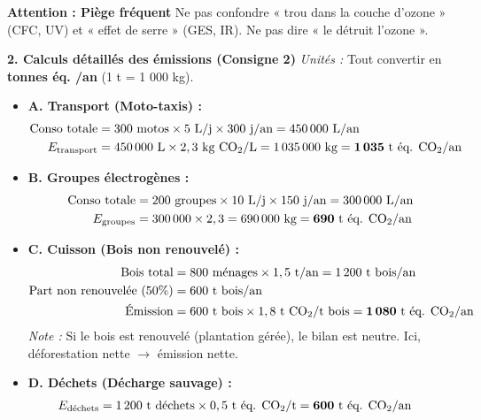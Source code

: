 \documentclass[11pt]{article}
\begin{document}
\begin{exoresolu}
\textbf{Attention : Piège fréquent}
Ne pas confondre « trou dans la couche d'ozone » (CFC, UV) et « effet de serre » (GES, IR). Ne pas dire « le  détruit l'ozone ».

\textbf{2. Calculs détaillés des émissions (Consigne 2)}
\emph{Unités :} Tout convertir en \textbf{tonnes éq. /an} (1 t = 1 000 kg).

\begin{itemize}
    \item \textbf{A. Transport (Moto-taxis) :}
    \begin{align*}
    \text{Conso totale} &= 300 \text{ motos} \times 5 \text{ L/j} \times 300 \text{ j/an} = 450\,000 \text{ L/an} \\
    E_{\text{transport}} &= 450\,000 \text{ L} \times 2,3 \text{ kg \ce{CO2}/L} = 1\,035\,000 \text{ kg} = \mathbf{1\,035 \text{ t éq. \ce{CO2}/an}}
    \end{align*}

    \item \textbf{B. Groupes électrogènes :}
    \begin{align*}
    \text{Conso totale} &= 200 \text{ groupes} \times 10 \text{ L/j} \times 150 \text{ j/an} = 300\,000 \text{ L/an} \\
    E_{\text{groupes}} &= 300\,000 \times 2,3 = 690\,000 \text{ kg} = \mathbf{690 \text{ t éq. \ce{CO2}/an}}
    \end{align*}

    \item \textbf{C. Cuisson (Bois non renouvelé) :}
    \begin{align*}
    \text{Bois total} &= 800 \text{ ménages} \times 1,5 \text{ t/an} = 1\,200 \text{ t bois/an} \\
    \text{Part non renouvelée (50\%)} &= 600 \text{ t bois/an} \\
    \text{Émission} &= 600 \text{ t bois} \times 1,8 \text{ t \ce{CO2}/t bois} = \mathbf{1\,080 \text{ t éq. \ce{CO2}/an}}
    \end{align*}
    \emph{Note :} Si le bois est renouvelé (plantation gérée), le bilan est neutre. Ici, déforestation nette $\rightarrow$ émission nette.

    \item \textbf{D. Déchets (Décharge sauvage) :}
    \begin{align*}
    E_{\text{déchets}} &= 1\,200 \text{ t déchets} \times 0,5 \text{ t éq. \ce{CO2}/t} = \mathbf{600 \text{ t éq. \ce{CO2}/an}}
    \end{align*}


\end{itemize}
\end{exoresolu}
\end{document}
